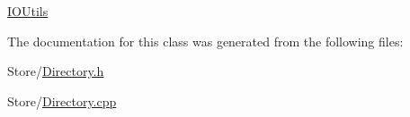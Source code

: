 \mbox{\hyperlink{classlucene_1_1core_1_1store_1_1IOUtils}{I\+O\+Utils}} 

The documentation for this class was generated from the following files\+:\begin{DoxyCompactItemize}
\item 
Store/\mbox{\hyperlink{Directory_8h}{Directory.\+h}}\item 
Store/\mbox{\hyperlink{Directory_8cpp}{Directory.\+cpp}}\end{DoxyCompactItemize}
